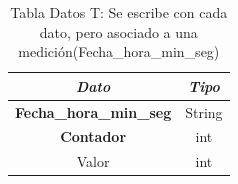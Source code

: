 \begin{table}[H]
	\centering
	\begin{tabular}{| c | c |}
		\hline
		\multicolumn{1}{|c|}{\textit{Dato}}&
		\multicolumn{1}{c|}{\textit{Tipo}}\\ \hline
		\textbf{Fecha\_hora\_min\_seg}  & String  \\ \hline
		\textbf{Contador}  & int  \\ \hline
		Valor & int  \\ \hline
	\end{tabular}
	\caption{Tabla Datos T: Se escribe con cada dato, pero asociado a una medición(Fecha\_hora\_min\_seg)}
	\label{tabla_datos_T}
\end{table}

